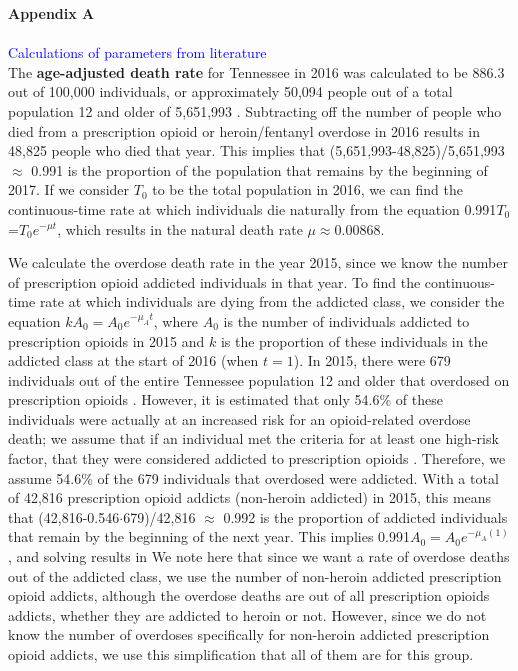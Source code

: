 \documentclass[12pt]{article}
\begin{document}
\textbf{Appendix A} \\ \\
\textcolor{blue}{Calculations of parameters from literature} \\
The \textbf{age-adjusted death rate} for Tennessee in 2016 was calculated to be 886.3 out of 100,000 individuals, or approximately 50,094 people out of a total population 12 and older of 5,651,993 \cite{Kaiser}. Subtracting off the number of people who died from a prescription opioid or heroin/fentanyl overdose in 2016 results in 48,825 people who died that year. This implies that (5,651,993-48,825)/5,651,993 $\approx$ 0.991 is the proportion of the population that remains by the beginning of 2017. If we consider $T_0$ to be the total population in 2016, we can find the continuous-time rate at which individuals die naturally from the equation 0.991$T_0$=$T_0e^{-\mu t}$, which results in the natural death rate $\mu \approx 0.00868$.



We calculate the overdose death rate in the year 2015, since we know the number of prescription opioid addicted individuals in that year. To find the continuous-time rate at which individuals are dying from the addicted class, we consider the equation $k A_{0}=A_{0}e^{-\mu_{A}t}$, where $A_0$ is the number of individuals addicted to prescription opioids in 2015 and $k$ is the proportion of these individuals in the addicted class at the start of 2016 (when $t=1$). In 2015, there were 679 individuals out of the entire Tennessee population 12 and older that overdosed on prescription opioids \cite{PDO}. However, it is estimated that only 54.6\% of these individuals were actually at an increased risk for an opioid-related overdose death; we assume that if an individual met the criteria for at least one high-risk factor, that they were considered addicted to prescription opioids \cite{Gwira}. Therefore, we assume 54.6\% of the 679 individuals that overdosed were addicted. With a total of 42,816 prescription opioid addicts (non-heroin addicted) in 2015, this means that (42,816-0.546$\cdot$679)/42,816 $\approx$ 0.992 is the proportion of addicted individuals that remain by the beginning of the next year. This implies 0.991$A_0=A_0 e^{-\mu_{A}(1)}$, and solving results in \unboldmath We note here that since we want a rate of overdose deaths out of the addicted class, we use the number of non-heroin addicted prescription opioid addicts, although the overdose deaths are out of all prescription opioids addicts, whether they are addicted to heroin or not. However, since we do not know the number of overdoses specifically for non-heroin addicted prescription opioid addicts, we use this simplification that all of them are for this group. 
\end{document}
